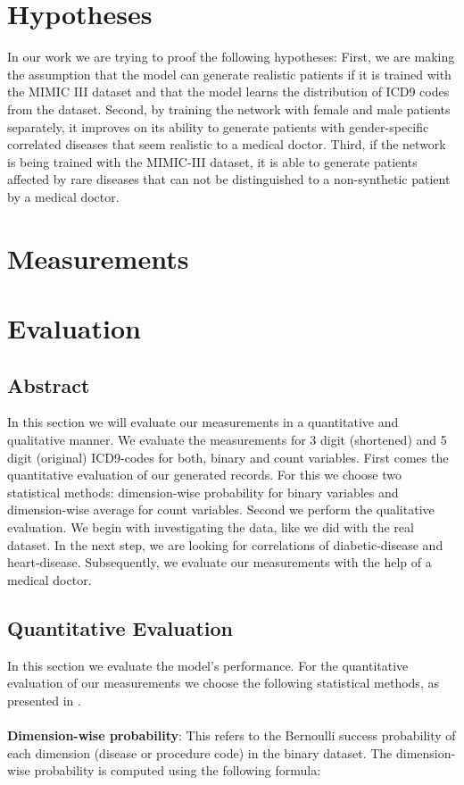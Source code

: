 \documentclass[11pt, a4paper]{book}
\begin{document}
\section{Hypotheses}
In our work we are trying to proof the following hypotheses:
First, we are making the assumption that the model can generate realistic patients if it is trained with the MIMIC III dataset and that the model learns the distribution of ICD9 codes from the dataset.
Second, by training the network with female and male patients separately, it improves on its ability to generate patients with gender-specific correlated diseases that seem realistic to a medical doctor.
Third, if the network is being trained with the MIMIC-III dataset, it is able to generate patients affected by rare diseases that can not be distinguished to a non-synthetic patient by a medical doctor.
\section{Measurements}

\section{Evaluation}
\subsection{Abstract}
In this section we will evaluate our measurements in a quantitative and qualitative manner. We evaluate the measurements for 3 digit (shortened) and 5 digit (original) ICD9-codes for both, binary and count variables.
First comes the quantitative evaluation of our generated records. For this we choose two statistical methods: dimension-wise probability for binary variables and dimension-wise average for count variables.
Second we perform the qualitative evaluation. We begin with investigating the data, like we did with the real dataset. In the next step, we are looking for correlations of diabetic-disease and heart-disease. Subsequently, we evaluate our measurements with the help of a medical doctor.
\subsection{Quantitative Evaluation}
In this section we evaluate the model's performance. For the quantitative evaluation of our measurements we choose the following statistical methods, as presented in \cite{Choi2017}.
\\
\\
\textbf{Dimension-wise probability}: This refers to the Bernoulli success probability of each dimension (disease or procedure code) in the binary dataset. The dimension-wise probability is computed using the following formula: 
\end{document}
